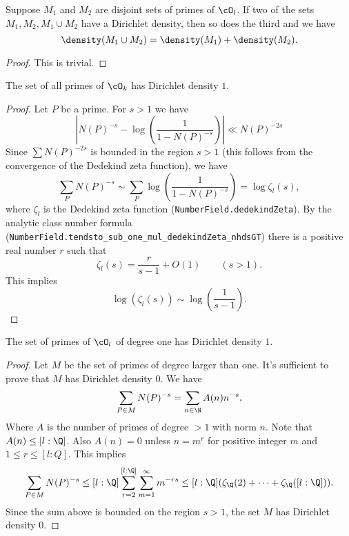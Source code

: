 \begin{lemma} \label{lem:Dirichlet density union}
	Suppose $M_1$ and $M_2$ are disjoint sets of primes of $\cO_l$.
	If two of the sets $M_1, M_2, M_1 \cup M_2$ have a Dirichlet density, then so does the third
	and we have
	\[
		\density(M_1 \cup M_2) = \density(M_1) + \density(M_2).
	\]
\end{lemma}

\begin{proof}
	This is trivial.
\end{proof}

\begin{lemma} \label{lem:Dirichlet density top}
	The set of all primes of $\cO_k$ has Dirichlet density $1$.
\end{lemma}

\begin{proof}
	Let $P$ be a prime. For $s > 1$ we have
	\[
		\left|N(P)^{-s} - \log\left( \frac{1}{1-N(P)^{-s}}\right)\right| \ll N(P)^{-2s}
	\]
	Since $\sum N(P)^{-2s}$ is bounded in the region $s > 1$ (this follows from the convergence of the
	Dedekind zeta function), we have
	\[
		\sum_P N(P)^{-s}
		\sim
		\sum_P \log\left( \frac{1}{1-N(P)^{-s}} \right)
		=
		\log \zeta_l(s),
	\]
	where $\zeta_l$ is the Dedekind zeta function (\texttt{NumberField.dedekindZeta}).
	By the analytic class number formula (\verb!NumberField.tendsto_sub_one_mul_dedekindZeta_nhdsGT!)
	there is a positive real number $r$ such that
	\[
		\zeta_l(s) = \frac{r}{s-1} + O(1) \qquad (s > 1).
	\]
	This implies
	\[
		\log(\zeta_l(s)) \sim \log\left( \frac{1}{s-1}\right).
	\]
\end{proof}



\begin{lemma} \label{lem:Dirichlet density degree one}
	The set of primes of $\cO_l$ of degree one has Dirichlet density $1$.
\end{lemma}

\begin{proof}
	Let $M$ be the set of primes of degree larger than one. It's sufficient to
	prove that $M$ has Dirichlet density $0$.
	We have
	\[
		\sum_{P \in M} N(P)^{-s}
		= \sum_{n \in \N} A(n) n^{-s},
	\]
	Where $A$ is the number of primes of degree $>1$ with norm $n$.
	Note that $A(n) \le [l:\Q]$. Also $A(n)=0$ unless $n=m^r$ for positive integer $m$ and
	$1 \le r \le [l:Q]$.
	This implies
	\[
		\sum_{P \in M} N(P)^{-s}
		\le [l:\Q] \sum_{r=2}^{[l:\Q]} \sum_{m =1} ^\infty m^{-rs}
		\le [l:\Q] (\zeta_\Q(2) + \cdots + \zeta_\Q([l:\Q]) ).
	\]
	Since the sum above is bounded on the region $s > 1$,
	the set $M$ has Dirichlet density $0$.
\end{proof}


